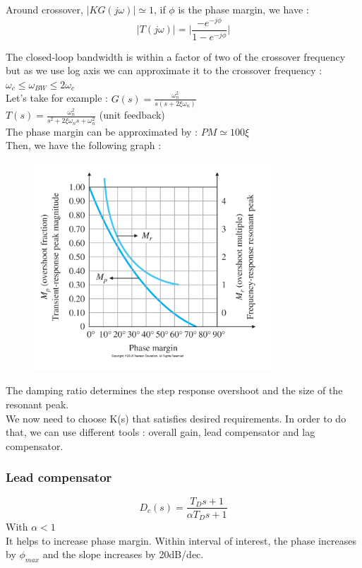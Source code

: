 \documentclass[../main.tex]{subfiles}
\begin{document}
Around crossover, $\lvert KG(j\omega)\rvert \simeq 1$, if $\phi$ is the phase margin, we have : \begin{equation}
    \lvert T(j\omega)\rvert = \lvert \frac{-e^{-j\phi}}{1-e^{-j\phi}}\rvert
\end{equation}

The closed-loop bandwidth is within a factor of two of the crossover frequency but as we use log axis we can approximate it to the crossover frequency : $\omega_c \leq \omega_{BW} \leq 2\omega_c$\\

Let's take for example : $G(s) = \frac{\omega_n^2}{s(s+2\xi \omega_n)}$\\
$T(s) = \frac{\omega_n^2}{s^2+2\xi \omega_n s+\omega_n^2}$ (unit feedback)\\

The phase margin can be approximated by : $PM \simeq 100\xi$\\

Then, we have the following graph : \begin{figure}[hbt!]
    \centering
    \includegraphics[width=.5\textwidth]{IMAGES/control/mpmr.png}
\end{figure}

The damping ratio determines the step response overshoot and the size of the resonant peak.\\

We now need to choose K(s) that satisfies desired requirements. In order to do that, we can use different tools : overall gain, lead compensator and lag compensator.\\

\subsubsection{Lead compensator}
\begin{equation}
    D_c(s) = \frac{T_Ds+1}{\alpha T_Ds+1}
\end{equation}
With $\alpha<1$\\
It helps to increase phase margin. Within interval of interest, the phase increases by $\phi_{max}$ and the slope increases by 20dB/dec.\\
\end{document}
